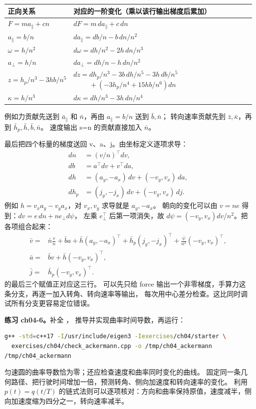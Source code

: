 \begin{center}\small
\begin{tabularx}{\linewidth}{@{}lX@{}}
\toprule 正向关系 & 对应的一阶变化（乘以该行输出梯度后累加）\\\midrule
$F=ma_\parallel+cn$ & $dF=m\,da_\parallel+c\,dn$\\
$a_\parallel=b/n$ & $da_\parallel=db/n-b\,dn/n^2$\\
$\omega=h/n^2$ & $d\omega=dh/n^2-2h\,dn/n^3$\\
$a_\perp=h/n$ & $da_\perp=dh/n-h\,dn/n^2$\\
$z=h_p/n^3-3hb/n^5$ & $dz=dh_p/n^3-3b\,dh/n^5-3h\,db/n^5$
\newline $\phantom{dz=}+(-3h_p/n^4+15hb/n^6)dn$\\
$\kappa=h/n^3$ & $d\kappa=dh/n^3-3h\,dn/n^4$\\
\bottomrule
\end{tabularx}
\end{center}
例如力贡献先送到 $\bar a_\parallel$ 和 $\bar n$，再由 $a_\parallel=b/n$ 送到 $\bar b,\bar n$；
转向速率贡献先到 $\bar z,\bar\kappa$，再到 $\bar h_p,\bar h,\bar b,\bar n$。
速度输出 s=n 的贡献直接加入 $\bar n$。

最后把四个标量的梯度送回 v、a、j。由坐标定义逐项求导：
\begin{align}
dn&=(v/n)^\top dv,\\
db&=a^\top dv+v^\top da,\\
dh&=(a_y,-a_x)\,dv+(-v_y,v_x)\,da,\\
dh_p&=(j_y,-j_x)\,dv+(-v_y,v_x)\,dj.
\end{align}
例如 $h=v_xa_y-v_ya_x$，对 $v_x,v_y$ 求导就是 $a_y,-a_x$。
朝向的变化可以由 $v=ne$ 得到：$dv=e\,dn+n e_\perp d\psi$，
左乘 $e_\perp^\top$ 后第一项消失，故
$d\psi=(-v_y,v_x)dv/n^2$。把各项组合起来：
\begin{align}
\bar v={}&\bar n\frac v n+\bar b a+\bar h(a_y,-a_x)^\top
 +\bar h_p(j_y,-j_x)^\top+\frac{\bar\psi}{n^2}(-v_y,v_x)^\top,\\
\bar a={}&\bar b v+\bar h(-v_y,v_x)^\top,\\
\bar j={}&\bar h_p(-v_y,v_x)^\top.
\end{align}
 的最后三个赋值正对应这三行。
可以先只给 force 输出一个非零梯度，手算力这条分支，再逐一加入转角、转向速率等输出，
每次用中心差分检查。这比同时调试所有分支更容易定位错误。

\textbf{练习 ch04-6。}补全 ，
推导并实现曲率时间导数，再运行：
\begin{lstlisting}[language=bash,numbers=none]
g++ -std=c++17 -I/usr/include/eigen3 -Iexercises/ch04/starter \
  exercises/ch04/check_ackermann.cpp -o /tmp/ch04_ackermann
/tmp/ch04_ackermann
\end{lstlisting}
匀速圆的曲率导数恰为零；还应检查速度和曲率同时变化的曲线。
固定同一条几何路径、把行驶时间增加一倍，预测转角、侧向加速度和转向速率的变化。
利用 $p(t)=q(t/T)$ 的链式法则可以逐项核对：方向和曲率保持原值，速度减半，侧向加速度缩为四分之一，转向速率减半。

